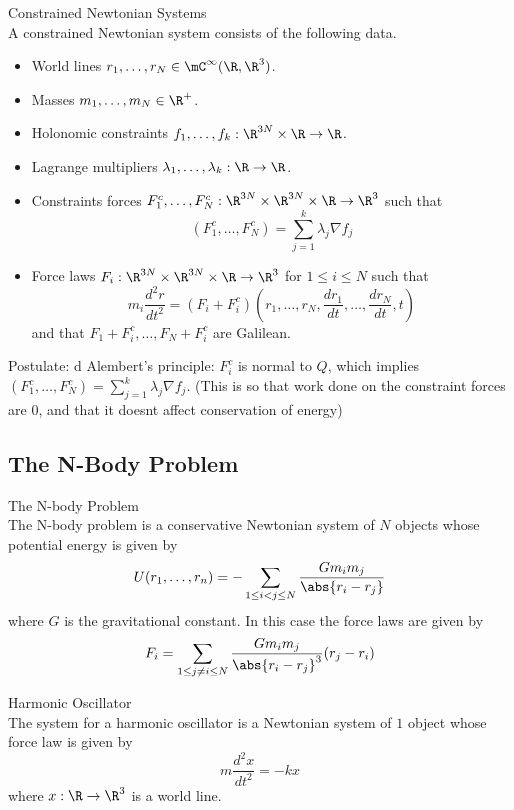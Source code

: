 \documentclass[a4paper]{article}
\begin{document}
\begin{defn}{Constrained Newtonian Systems}{}\\
A constrained Newtonian system consists of the following data. 
\begin{itemize}
\item World lines $r_1,\dots,r_N\in\mC^\infty(\R,\R^3)$. 
\item Masses $m_1,\dots,m_N\in\R^+$. 
\item Holonomic constraints $f_1,\dots,f_k:\R^{3N}\times\R\to\R$. 
\item Lagrange multipliers $\lambda_1,\dots,\lambda_k:\R\to\R$. 
\item Constraints forces $F_1^c,\dots,F_N^c:\R^{3N}\times\R^{3N}\times\R\to\R^3$ such that $$(F_1^c,\dots,F_N^c)=\sum_{j=1}^k\lambda_j\nabla f_j$$
\item Force laws $F_i:\R^{3N}\times\R^{3N}\times\R\to\R^3$ for $1\leq i\leq N$ such that $$m_i\frac{d^2r}{dt^2}=(F_i+F_i^c)\left(r_1,\dots,r_N,\frac{dr_1}{dt},\dots,\frac{dr_N}{dt},t\right)$$ and that $F_1+F_i^c,\dots,F_N+F_i^c$ are Galilean. 
\end{itemize}
\end{defn}

Postulate: d Alembert's principle: $F_i^c$ is normal to $Q$, which implies $(F_1^c,\dots,F_N^c)=\sum_{j=1}^k\lambda_j\nabla f_j$. (This is so that work done on the constraint forces are $0$, and that it doesnt affect conservation of energy)

\subsection{The N-Body Problem}
\begin{eg}{The N-body Problem}{}\\
The N-body problem is a conservative Newtonian system of $N$ objects whose potential energy is given by $$U(r_1,\dots,r_n)=-\sum_{1\leq i<j\leq N}\frac{Gm_im_j}{\abs{r_i-r_j}}$$ where $G$ is the gravitational constant. In this case the force laws are given by $$F_i=\sum_{1\leq j\neq i\leq N}\frac{Gm_im_j}{\abs{r_i-r_j}^3}(r_j-r_i)$$
\end{eg}

\begin{eg}{Harmonic Oscillator}{}\\
The system for a harmonic oscillator is a Newtonian system of $1$ object whose force law is given by $$m\frac{d^2x}{dt^2}=-kx$$ where $x:\R\to\R^3$ is a world line. 
\end{eg}
\end{document}
